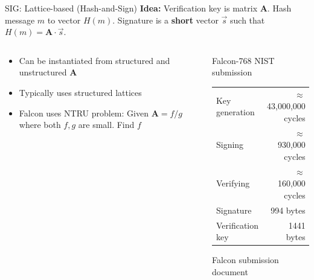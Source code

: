 \documentclass[xcolor=table,10pt,aspectratio=169]{beamer}
\begin{document}
\begin{frame}[label={sec:org55cf6cb}]{SIG: Lattice-based (Hash-and-Sign)}
\textbf{Idea:} Verification key is matrix \(\mathbf{A}\). Hash message \(m\) to vector \(H(m)\). Signature is a \textbf{short} vector \(\vec{s}\) such that \(H(m) = \mathbf{A}\cdot \vec{s}\).

\begin{columns}[t]
\begin{column}{0.5\columnwidth}
\begin{itemize}
\item Can be instantiated from structured and unstructured \(\mathbf{A}\)
\item Typically uses structured lattices
\item Falcon uses NTRU problem: Given \(\mathbf{A} = f/g\) where both \(f,g\) are small. Find \(f\)
\end{itemize}
\end{column}

\begin{column}{0.5\columnwidth}
Falcon-768 NIST submission

\begin{center}
\begin{tabular}{lr}
Key generation & \(\approx\) 43,000,000 cycles\\
Signing & \(\approx\)    930,000 cycles\\
Verifying & \(\approx\)    160,000 cycles\\
Signature & 994 bytes\\
Verification key & 1441 bytes\\
\end{tabular}

\end{center}


\small Falcon submission document
\end{column}
\end{columns}
\end{frame}
\end{document}
